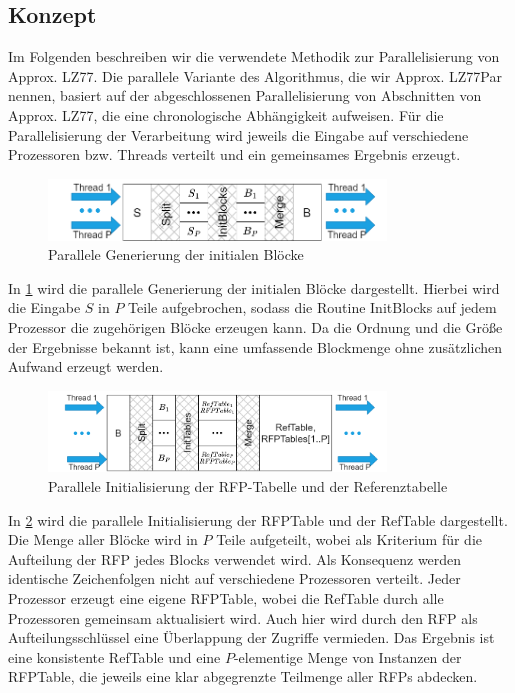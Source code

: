 \subsection{Konzept}
Im Folgenden beschreiben wir die verwendete Methodik zur Parallelisierung von Approx. LZ77. Die parallele Variante des Algorithmus, die wir Approx. LZ77Par nennen, basiert auf der abgeschlossenen
Parallelisierung von Abschnitten von Approx. LZ77, die eine chronologische Abhängigkeit aufweisen. Für die Parallelisierung der Verarbeitung wird jeweils die Eingabe auf verschiedene Prozessoren 
bzw. Threads verteilt und ein gemeinsames Ergebnis erzeugt.
\begin{figure}[ht]
    \centering
    \includegraphics[width=0.8\textwidth]{Images/parallel_initnodes.png}
    \caption{Parallele Generierung der initialen Blöcke}
    \label{fig:parinitnodes}
\end{figure}
In \ref{fig:parinitnodes} wird die parallele Generierung der initialen Blöcke dargestellt. Hierbei wird die Eingabe $S$ in $P$ Teile aufgebrochen, sodass die Routine InitBlocks auf jedem Prozessor
die zugehörigen Blöcke erzeugen kann. Da die Ordnung und die Größe der Ergebnisse bekannt ist, kann eine umfassende Blockmenge ohne zusätzlichen Aufwand erzeugt werden.
\begin{figure}[ht]
    \centering
    \includegraphics[width=0.8\textwidth]{Images/parallel_inittables.png}
    \caption{Parallele Initialisierung der RFP-Tabelle und der Referenztabelle}
    \label{fig:parinittables}
\end{figure}
In \ref{fig:parinittables} wird die parallele Initialisierung der RFPTable und der RefTable dargestellt. Die Menge aller Blöcke wird in $P$ Teile aufgeteilt, wobei als Kriterium für die
Aufteilung der RFP jedes Blocks verwendet wird. Als Konsequenz werden identische Zeichenfolgen nicht auf verschiedene Prozessoren verteilt. Jeder Prozessor erzeugt eine eigene RFPTable, wobei
die RefTable durch alle Prozessoren gemeinsam aktualisiert wird. Auch hier wird durch den RFP als Aufteilungsschlüssel eine Überlappung der Zugriffe vermieden. Das Ergebnis ist eine konsistente
RefTable und eine $P$-elementige Menge von Instanzen der RFPTable, die jeweils eine klar abgegrenzte Teilmenge aller RFPs abdecken.

